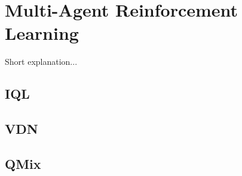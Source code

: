 \chapter{Multi-Agent Reinforcement Learning}

Short explanation...

\section{IQL}

\section{VDN}

\section{QMix}
